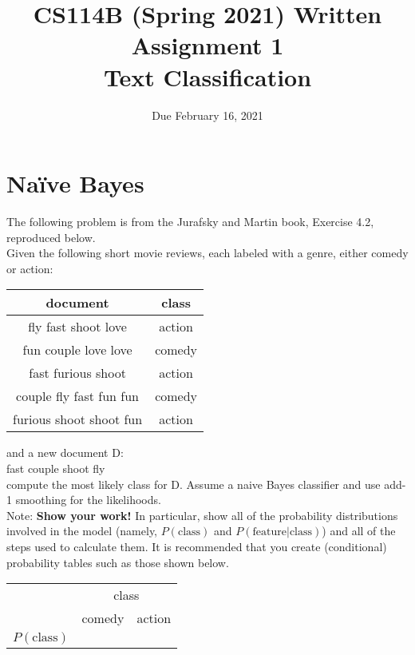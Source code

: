\documentclass[11pt,letterpaper]{article}
\begin{document}
\title{CS114B (Spring 2021) Written Assignment 1\\Text Classification}
\author{Due February 16, 2021}
\date{}
\maketitle

\section{Na\"ive Bayes}

The following problem is from the Jurafsky and Martin book, Exercise 4.2, reproduced below.\\

\noindent Given the following short movie reviews, each labeled with a genre, either comedy or action:

\begin{center}
\begin{tabular}{|c|c|}
\hline 
document & class \\ 
\hline 
fly fast shoot love & action \\ 
\hline 
fun couple love love & comedy \\ 
\hline 
fast furious shoot & action \\ 
\hline 
couple fly fast fun fun & comedy \\ 
\hline 
furious shoot shoot fun & action \\ 
\hline 
\end{tabular} 
\end{center}

\noindent and a new document D:\\

fast couple shoot fly\\

\noindent compute the most likely class for D. Assume a naive Bayes classifier and use add-1 smoothing for the likelihoods.\\

\noindent Note: \textbf{Show your work!} In particular, show all of the probability distributions involved in the model (namely, $P(\mathrm{class})$ and $P(\mathrm{feature|class})$) and all of the steps used to calculate them. It is recommended that you create (conditional) probability tables such as those shown below.\newpage

\begin{center}
\begin{tabular}{|c|c|c|}
\hline 
 & \multicolumn{2}{|c|}{class} \\ 
\cline{2-3}
 & comedy & action \\ 
\hline 
$P(\mathrm{class})$ &  &  \\ 
\hline
\end{tabular} 
\end{center}
\end{document}
